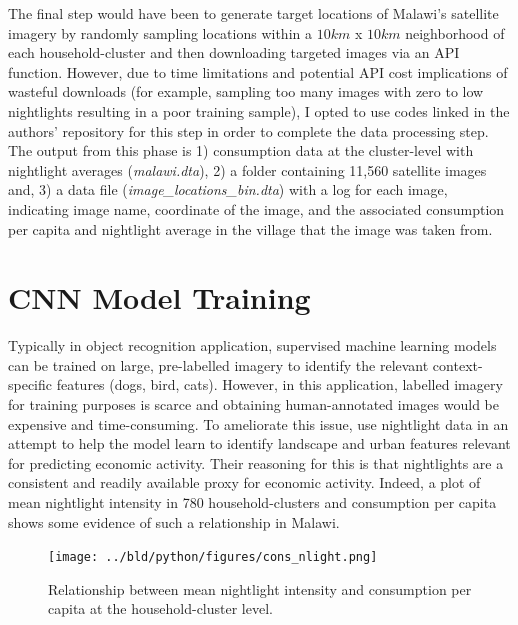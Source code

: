 \documentclass[11pt, a4paper, leqno]{article}
\begin{document}
 The final step would have been to generate target locations of Malawi's satellite imagery by randomly sampling locations within a $10km$ x $10km$ neighborhood of each household-cluster and then downloading  targeted images via an API function. However, due to time limitations and potential API cost implications of wasteful downloads (for example, sampling too many images with zero to low nightlights resulting in a poor training sample), I opted to use codes linked in the authors'  repository for this step in order to complete the data processing step. The output from this phase is 1) consumption data at the cluster-level with nightlight averages (\textit{malawi.dta}), 2) a folder containing 11,560 satellite images and, 3) a data file (\textit{image\_locations\_bin.dta}) with a log for each image, indicating image name, coordinate of the image, and the associated consumption per capita and  nightlight average in the village that the image was taken from.

\section{CNN Model Training}

 Typically in object recognition application, supervised machine learning models can be trained on large, pre-labelled imagery to identify the relevant context-specific features (dogs, bird, cats). However, in this application, labelled imagery for training purposes is scarce and obtaining human-annotated images would be expensive and time-consuming. To ameliorate this issue, \citet{jean2016combining} use nightlight data in an attempt to help the model learn to identify landscape and urban features relevant for predicting economic activity. Their reasoning for this is that nightlights are a consistent and readily available proxy for economic activity. Indeed, a plot of mean nightlight intensity in 780 household-clusters and consumption per capita shows some evidence of such a relationship in Malawi.

\begin{figure}[H]

\centering
    \texttt{[image: ../bld/python/figures/cons\_nlight.png]}
    \caption{Relationship between mean nightlight intensity and consumption per capita at the household-cluster level.}
    \label{fig:python-predictions}

\end{figure}
\end{document}

